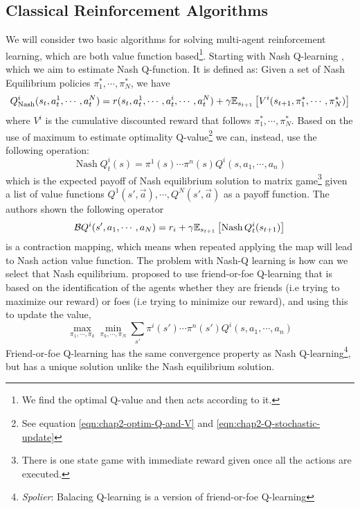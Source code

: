 \subsection{Classical Reinforcement Algorithms}
We will consider two basic algorithms for solving multi-agent reinforcement learning, which are both value function based\footnote{We find the optimal Q-value and then acts according to it.}. Starting with Nash Q-learning \cite{hu2003nash}, which we aim to estimate Nash Q-function. It is defined as: Given a set of Nash Equilibrium policies $\pi_1^*, \cdots, \pi_N^*$, we have 
\begin{equation}
    Q^i_{\operatorname{Nash}}(s_t, a^1_t, \cdots, a^N_t) = r(s_t, a^1_t, \cdots, a^i_t, \cdots, a^N_t) + \gamma\mathbb{E}_{s_{t+1}}\left[ V^i(s_{t+1}, \pi_1^*, \cdots, \pi_N^*) \right]
\end{equation}
where $V^i$ is the cumulative discounted reward that follows $\pi_1^*, \cdots, \pi_N^*$. Based on the use of maximum to estimate optimality Q-value\footnote{See equation \ref{eqn:chap2-optim-Q-and-V} and \ref{eqn:chap2-Q-stochastic-update}} we can, instead, use the following operation:
\begin{equation}
    \operatorname{Nash} Q^i_t(s) = \pi^1(s)\cdots\pi^n(s)Q^i(s, a_1, \cdots, a_n)
\end{equation}
which is the expected payoff of Nash equilibrium solution to matrix game\footnote{There is one state game with immediate reward given once all the actions are executed.} given a list of value functions $Q^1(s', \vec{a}), \cdots, Q^N(s', \vec{a})$ as a payoff function. The authors shown the following operator 
\begin{equation}
    \mathcal{B} Q^i(s', a_1, \cdots, a_N) = r_i + \gamma \mathbb{E}_{s_{t+1}}\left[ \operatorname{Nash} Q^i_t(s_{t+1})  \right]
\end{equation}
is a contraction mapping, which means when repeated applying the map will lead to Nash action value function. The problem with Nash-Q learning is how can we select that Nash equilibrium. \cite{littman2001friend} proposed to use friend-or-foe Q-learning that is based on the identification of the agents whether they are friends (i.e trying to maximize our reward) or foes (i.e trying to minimize our reward), and using this to update the value,
\begin{equation}
    \max_{\pi_1, \cdots, \pi_k} \min_{\pi_k, \cdots, \pi_N}\sum_{s'} \pi^i(s')\cdots\pi^n(s')Q^i(s, a_1, \cdots, a_n)
\end{equation}
Friend-or-foe Q-learning has the same convergence property as Nash Q-learning\footnote{\textit{Spolier}: Balacing Q-learning is a  version of friend-or-foe Q-learning}, but has a unique solution unlike the Nash equilibrium solution.